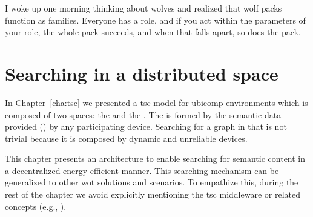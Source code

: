 
\begin{savequote}[50mm]
I woke up one morning thinking about wolves and realized that wolf packs function as families.
Everyone has a role, and if you act within the parameters of your role, the whole pack succeeds, and when that falls apart, so does the pack.
\end{savequote}


\chapter{Searching in a distributed space}
\label{cha:searching}


\newcommand{\Space}{\emph{Space}} %
\newcommand{\Spaces}{\emph{Spaces}} %
\newcommand{\consumer}{\emph{Consumer}}
\newcommand{\consumers}{\emph{Consumers}}
\newcommand{\provider}{\emph{Provider}}
\newcommand{\providers}{\emph{Providers}}
\newcommand{\clue}{\emph{clue}}
\newcommand{\clues}{\emph{clues}}


\ifpdf
    \graphicspath{{\pathchapfive/figures/PNG/}{\pathchapfive/figures/PDF/}{\pathchapfive/figures/}}
\else
    \graphicspath{{\pathchapfive/figures/EPS/}{\pathchapfive/figures/}}
\fi



In Chapter~\ref{cha:tsc} we presented a \ac{tsc} model for \ac{ubicomp} environments which is composed of two spaces: the \coordspace{} and the \outerspace{}.
The \outerspace{} is formed by the semantic data provided (\selfgraphs{}) by any participating device.
Searching for a graph in that \outerspace{} is not trivial because it is composed by dynamic and unreliable devices.

This chapter presents an architecture to enable searching for semantic content in a decentralized energy efficient manner.
This searching mechanism can be generalized to other \ac{wot} solutions and scenarios.
To empathize this, during the rest of the chapter we avoid explicitly mentioning the \ac{tsc} middleware or related concepts (e.g., \outerspace{}).



